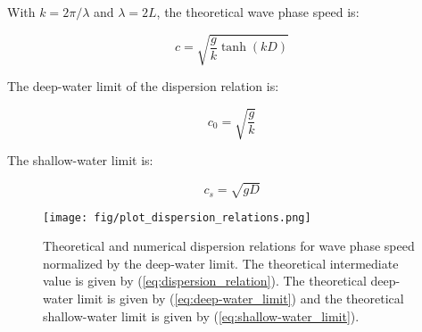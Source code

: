 \documentclass[12pt]{article}
\begin{document}
\section{}

With $k = 2\pi/\lambda$ and $\lambda = 2L$, the theoretical wave phase speed is:

\begin{equation} \label{eq:dispersion_relation}
c = \sqrt{\frac{g}{k} \tanh(kD)}
\end{equation}

The deep-water limit of the dispersion relation is:

\begin{equation} \label{eq:deep-water_limit}
c_0 = \sqrt{\frac{g}{k}}
\end{equation}

The shallow-water limit is:

\begin{equation} \label{eq:shallow-water_limit}
c_s = \sqrt{gD}
\end{equation}

	\begin{figure}[htb]
		\begin{center}
			\texttt{[image: fig/plot\_dispersion\_relations.png]}
			\caption{Theoretical and numerical dispersion relations for wave phase speed normalized by the deep-water limit. The theoretical intermediate value is given by (\ref{eq:dispersion_relation}). The theoretical deep-water limit is given by (\ref{eq:deep-water_limit}) and the theoretical shallow-water limit is given by (\ref{eq:shallow-water_limit}).}
			\label{fig:plot_dispersion_relations}
		\end{center}
	\end{figure}

\section{}
\end{document}
